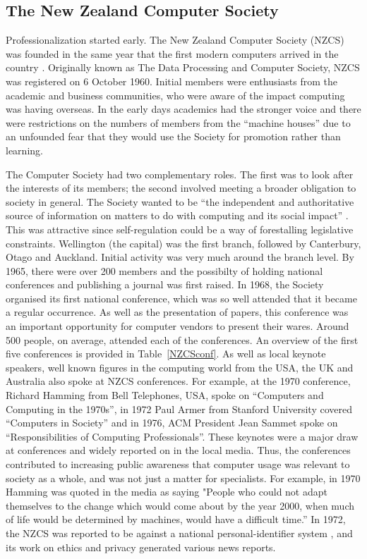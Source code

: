 \documentclass{IEEEcsmag}
\begin{document}
\subsection{The New Zealand Computer Society}
\vspace*{5pt}
Professionalization started early. The New Zealand Computer Society (NZCS) was founded in the same year that the first modern computers arrived in the country \cite{Moon2010}.
Originally known as The Data Processing and Computer Society, NZCS was registered on 6 October 1960. Initial members were enthusiasts from the academic and business communities, who were aware of the impact computing was having overseas. In the early days academics had the stronger voice and there were restrictions on the numbers of members from the “machine houses” due to an unfounded fear that they would use the Society for promotion rather than learning.

The Computer Society had two complementary roles. The first was to look after the interests of its members; the second involved meeting a broader obligation to society in general. The Society wanted to be “the independent and authoritative source of information on matters to do with computing and its social impact” . This was attractive since self-regulation could be a way of forestalling legislative constraints.
Wellington (the capital) was the first branch, followed by Canterbury, Otago and Auckland. Initial activity was very much around the branch level. By 1965, there were over 200 members and the possibilty of holding national conferences and publishing a journal was first raised. 
In 1968, the Society organised its first national conference, which was so well attended that it became a regular occurrence. As well as the presentation of papers, this conference was an important opportunity for computer vendors to present their wares. Around 500 people, on average, attended each of the conferences. An overview of the first five conferences is provided in Table~\ref{NZCSconf}. As well as local keynote speakers, well known figures in the computing world from the USA, the UK and Australia also spoke at NZCS conferences. For example, at the 1970 conference, Richard Hamming from Bell Telephones, USA, spoke on “Computers and Computing in the 1970s”, in 1972 Paul Armer from Stanford University covered “Computers in Society” and in 1976, ACM President Jean Sammet spoke on “Responsibilities of Computing Professionals”. These keynotes were a major draw at conferences and widely reported on in the local media.
\cbstart
Thus, the conferences contributed to increasing public awareness that computer usage was relevant to society as a whole, and was not just  a matter for specialists. For example, in 1970 Hamming was quoted in the media as saying "People who could not adapt themselves to the change which would come about by the year 2000, when much of life would be determined by machines, would have a difficult time.” \cite{Press-Hamming} In 1972, the NZCS was reported to be against a national personal-identifier system \cite{Press-Nat-ID}, and its work on ethics and privacy generated various news reports.
\cbend
\end{document}
